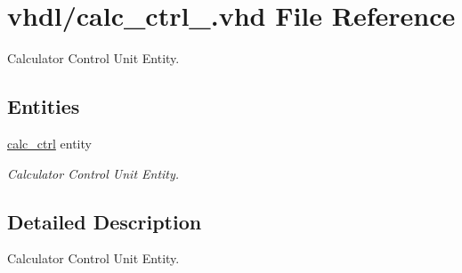 \hypertarget{calc__ctrl___8vhd}{}\section{vhdl/calc\+\_\+ctrl\+\_\+.vhd File Reference}
\label{calc__ctrl___8vhd}


Calculator Control Unit Entity.  


\subsection*{Entities}
\begin{DoxyCompactItemize}
\item 
\hyperlink{classcalc__ctrl}{calc\+\_\+ctrl} entity
\begin{DoxyCompactList}\small\item\em Calculator Control Unit Entity. \end{DoxyCompactList}\end{DoxyCompactItemize}


\subsection{Detailed Description}
Calculator Control Unit Entity. 

